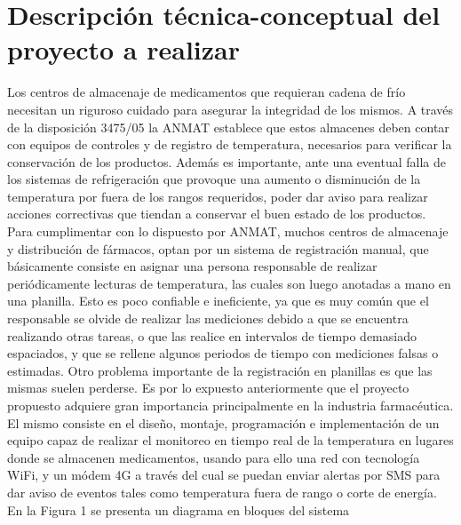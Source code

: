 \documentclass[11pt]{charter}
\begin{document}
\section{Descripción técnica-conceptual del proyecto a realizar}
\label{sec:descripcion}
Los centros de almacenaje de medicamentos que requieran cadena de frío necesitan un riguroso cuidado para asegurar la integridad de los mismos. A través de la disposición 3475/05 la ANMAT establece que estos almacenes deben contar con equipos de controles y de registro de temperatura, necesarios para verificar la conservación de los productos.\newline 
Además es importante, ante una eventual falla de los sistemas de refrigeración que provoque una aumento o disminución de la temperatura por fuera de los rangos requeridos, poder dar aviso para realizar acciones correctivas que tiendan a conservar el buen estado de los productos.\newline
Para cumplimentar con lo dispuesto por ANMAT, muchos centros de almacenaje y distribución de fármacos, optan por un sistema de registración manual, que básicamente consiste en asignar una persona responsable de realizar periódicamente lecturas de temperatura, las cuales son luego anotadas a mano en una planilla. Esto es poco confiable e ineficiente, ya que es muy común que el responsable se olvide de realizar las mediciones debido a que se encuentra realizando otras tareas, o que las realice en intervalos de tiempo demasiado espaciados, y que se rellene algunos periodos de tiempo con mediciones falsas o estimadas.\newline
Otro problema importante de la registración en planillas es que las mismas suelen perderse.\newline
Es por lo expuesto anteriormente que el proyecto propuesto adquiere gran importancia principalmente en la industria farmacéutica.\newline 
El mismo consiste en el diseño, montaje, programación e implementación de un equipo capaz de realizar el monitoreo en tiempo real de la temperatura en lugares donde se almacenen medicamentos, usando para ello una red con tecnología WiFi, y un módem 4G a través del cual se puedan enviar alertas por SMS para dar aviso de eventos tales como temperatura fuera de rango o corte de energía.\newline
En la Figura 1 se presenta un diagrama en bloques del sistema  

\vspace{25px}
\end{document}
